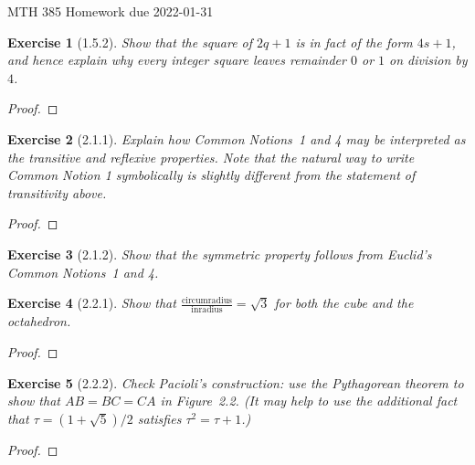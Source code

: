 \documentclass[12pt]{article}
\theoremstyle{plain}
\newtheorem{ex}{Exercise}
\begin{document}
MTH 385 \qquad Homework due 2022-01-31


\begin{ex} [1.5.2]
  Show that the square of $2q+1$ is in fact of the form $4s+1$, and hence explain why every integer square leaves remainder $0$ or $1$ on division by $4$.
\end{ex}

\begin{proof}
 
\end{proof}

\begin{ex} [2.1.1]
  Explain how Common Notions~1 and 4 may be interpreted as the transitive and reflexive properties. Note that the natural way to write Common Notion 1 symbolically is slightly different from the statement of transitivity above.
\end{ex}

\begin{proof}
 
\end{proof}

\begin{ex} [2.1.2]
  Show that the symmetric property follows from Euclid's Common Notions~1 and 4.
\end{ex}

\begin{ex} [2.2.1]
  Show that $\frac{\text{circumradius}}{\text{inradius}}=\sqrt{3}$ for both the cube and the octahedron.
\end{ex}

\begin{proof}
 
\end{proof}

\begin{ex} [2.2.2]
  Check Pacioli's construction: use the Pythagorean theorem to show that $AB=BC=CA$ in Figure~2.2. (It may help to use the additional fact that $\tau=(1+\sqrt{5})/2$ satisfies $\tau^2=\tau+1$.)
\end{ex}

\begin{proof}
 
\end{proof}
\end{document}
